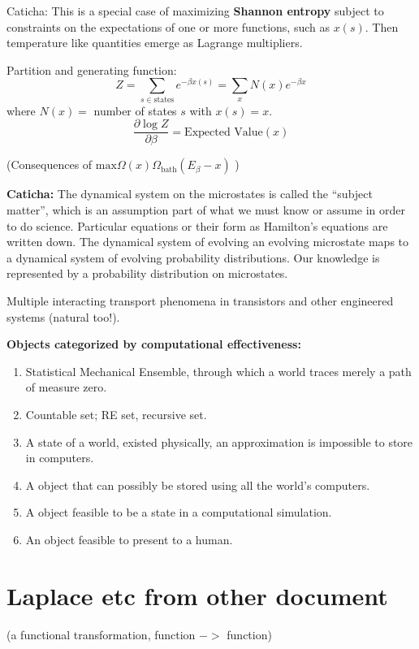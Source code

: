 \documentclass{article}
\begin{document}
Caticha: This is a special case of maximizing \textbf{Shannon entropy}
subject to constraints on the expectations of one or more functions, such as 
$x(s)$.  Then temperature like quantities emerge as Lagrange multipliers.

Partition and generating function:
\[
Z = \sum_{s\in\text{states}}e^{-\beta x(s)} = \sum_{x}N(x)e^{-\beta x} 
\]
where $N(x)= $ number of states $s$ with $x(s) = x$.
\[
\frac{\partial{\log Z}}{\partial\beta}
=
\text{Expected Value}(x)
\]

(Consequences of $\text{max}\Omega(x)\Omega_{\text{bath}}(E_\beta -x )$
\cite{CatichaEIFP})

\textbf{Caticha:} The dynamical system on the microstates is called
the ``subject matter'', which is an assumption part of what we must know or 
assume
in order to do science.  Particular equations or their form as
Hamilton's equations are written down.
The dynamical system of evolving an evolving 
microstate maps to a dynamical system of evolving probability 
distributions.  Our knowledge is represented by a probability distribution
on microstates.  


Multiple interacting transport phenomena in transistors and other 
engineered systems (natural too!).
 
\textbf{Objects categorized by computational effectiveness:}
\begin{enumerate}
\item Statistical Mechanical Ensemble, through which a world traces
merely a path of measure zero.
\item Countable set; RE set, recursive set.
\item A state of a world, existed physically, an approximation is 
impossible to store in computers.
\item A object that can possibly be stored using all the world's 
computers.
\item A object feasible to be a state in a computational simulation.
\item An object feasible to present to a human.
\end{enumerate}

 



\section{Laplace etc from other document}


(a functional transformation, function $->$ function)
\end{document}
